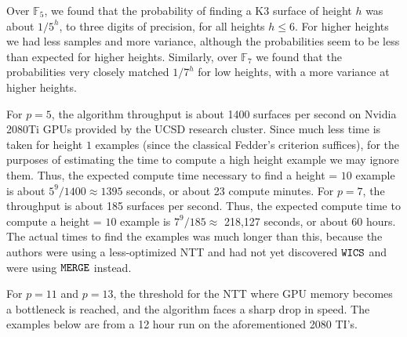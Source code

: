 Over \(\mathbb{F}_{5}\), we 
found that the probability of finding a K3 surface
of height \(h\) was about \(1 / 5^{h}\), to three digits
of precision, for all heights \(h \leq 6\).
For higher heights we had less samples
and more variance, although
the probabilities seem to be less than expected
for higher heights.
Similarly, over \(\mathbb{F}_{7}\) we found that
the probabilities very closely matched \(1 / 7^{h}\) 
for low heights, with a more variance at higher heights.

For \(p=5\), the algorithm throughput is about
1400 surfaces per second on 
Nvidia 2080Ti GPUs provided by the 
UCSD research cluster.
Since much less time is taken for height \(1\) examples
(since the classical Fedder's criterion suffices), 
for the purposes of estimating the time to compute a
high height example we may ignore them.
Thus,
the expected compute time necessary to find a height = \(10\) 
example is about  \(5^{9} / 1400 \approx 1395\) seconds, or about 
23 compute minutes.
For \(p=7\), the throughput is about 185 surfaces
per second.
Thus, the expected compute time to compute
a height = \(10\) example is 
\(7^{9} / 185 \approx \) 218,127 seconds, or about 
60 hours.
The actual times to find the examples was much 
longer than this, because the authors were using a 
less-optimized NTT and had not yet discovered \(\wics\) 
and were using \(\merge\) instead.

For $p = 11$ and $p = 13$, the threshold for the NTT where 
GPU memory becomes a bottleneck is reached, and the algorithm 
faces a sharp drop in speed. The examples below are from a 12
hour run on the aforementioned 2080 TI's.

